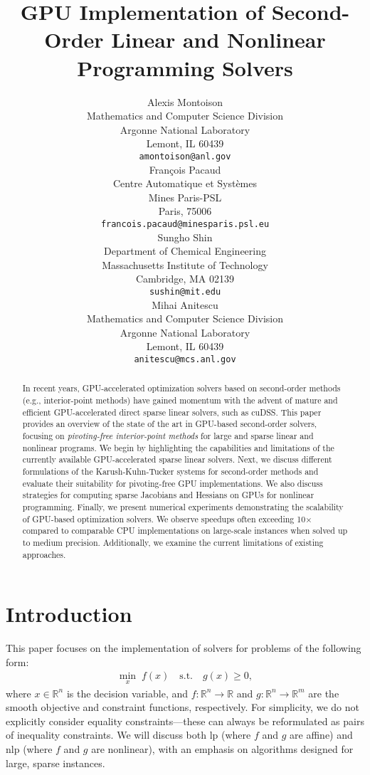 \documentclass{article}
\title{GPU Implementation of Second-Order Linear and Nonlinear Programming Solvers}
\author{%
  Alexis Montoison\\
  Mathematics and Computer Science Division\\
  Argonne National Laboratory\\
  Lemont, IL 60439\\
  \texttt{amontoison@anl.gov}\\
  \And
  Fran\c{c}ois Pacaud\\
  Centre Automatique et Systèmes\\
  Mines Paris-PSL\\
  Paris, 75006 \\
  \texttt{francois.pacaud@minesparis.psl.eu}\\
  \And
  Sungho Shin\\
  Department of Chemical Engineering\\
  Massachusetts Institute of Technology\\
  Cambridge, MA 02139\\
  \texttt{sushin@mit.edu}\\
  \And
  Mihai Anitescu\\
  Mathematics and Computer Science Division\\
  Argonne National Laboratory\\
  Lemont, IL 60439\\
  \texttt{anitescu@mcs.anl.gov}\\
}
\begin{document}
\maketitle


\begin{abstract}
In recent years, GPU-accelerated optimization solvers based on second-order methods (e.g., interior-point methods) have gained momentum with the advent of mature and efficient GPU-accelerated direct sparse linear solvers, such as cuDSS. This paper provides an overview of the state of the art in GPU-based second-order solvers, focusing on \emph{pivoting-free interior-point methods} for large and sparse linear and nonlinear programs. We begin by highlighting the capabilities and limitations of the currently available GPU-accelerated sparse linear solvers. Next, we discuss different formulations of the Karush-Kuhn-Tucker systems for second-order methods and evaluate their suitability for pivoting-free GPU implementations. We also discuss strategies for computing sparse Jacobians and Hessians on GPUs for nonlinear programming. Finally, we present numerical experiments demonstrating the scalability of GPU-based optimization solvers. We observe speedups often exceeding 10× compared to comparable CPU implementations on large-scale instances when solved up to medium precision. Additionally, we examine the current limitations of existing approaches.

\end{abstract}

\section{Introduction}\label{eqn:intro}

This paper focuses on the implementation of solvers for problems of the following form:
\begin{align}\label{eqn:opt}
  \min_{x } \; f(x) \quad \text{s.t.} \quad g(x) \geq 0,
\end{align}
where \(x \in \mathbb{R}^n\) is the decision variable, and \(f: \mathbb{R}^n \to \mathbb{R}\) and \(g: \mathbb{R}^n \to \mathbb{R}^m\) are the smooth objective and constraint functions, respectively. 
For simplicity, we do not explicitly consider equality constraints—these can always be reformulated as pairs of inequality constraints. 
We will discuss both \gls*{lp} (where \(f\) and \(g\) are affine) and \gls*{nlp} (where \(f\) and \(g\) are nonlinear), with an emphasis on algorithms designed for large, sparse instances.
\end{document}
